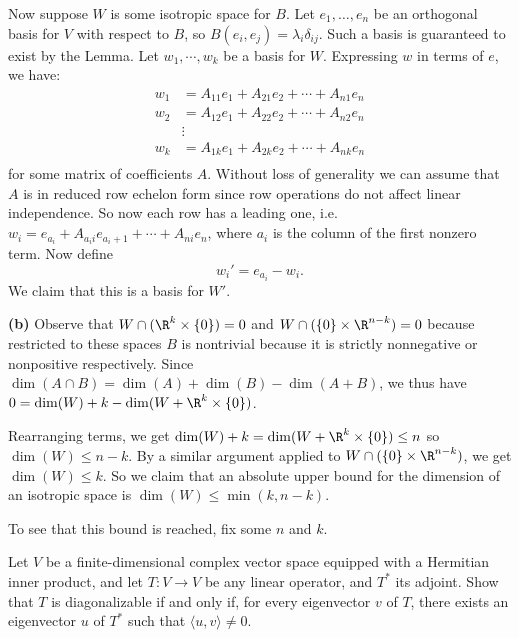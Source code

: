 \documentclass[11pt, letterpaper]{article}
\begin{document}
Now suppose $W$ is some isotropic space for $B$. Let $e_1,\ldots, e_n$ be an orthogonal basis for $V$ with respect to $B$, so $B(e_i, e_j)=\lambda_i\delta_{ij}$. Such a basis is guaranteed to exist by the Lemma. Let $w_1,\cdots,w_k$ be a basis for $W$. Expressing $w$ in terms of $e$, we have: 
\[
    \begin{aligned}
        w_1&=A_{11}e_1+A_{21}e_2+\cdots+A_{n1}e_n\\
        w_2&=A_{12}e_1+A_{22}e_2+\cdots+A_{n2}e_n\\
        &\vdots\\
        w_k&=A_{1k}e_1+A_{2k}e_2+\cdots+A_{nk}e_n\\
    \end{aligned}
\]
for some matrix of coefficients $A$. Without loss of generality we can assume that $A$ is in reduced row echelon form since row operations do not affect linear independence. So now each row has a leading one, i.e. $w_i=e_{a_i}+A_{a_ii}e_{a_i+1}+\cdots+A_{ni}e_n$, where $a_i$ is the column of the first nonzero term. Now define
\[
    w_i' = e_{a_i} - w_i
.\] 
We claim that this is a basis for $W'$. 

\textbf{(b)} Observe that $W\cap (\R^k\times\{0\})=0$ and $W\cap (\{0\}\times \R^{n-k})=0$ because restricted to these spaces $B$ is nontrivial because it is strictly nonnegative or nonpositive respectively. Since $\dim(A\cap B)=\dim(A)+\dim(B)-\dim(A+B)$, we thus have $0=\dim(W)+k-\dim(W+\R^k\times\{0\})$. 

Rearranging terms, we get $\dim(W)+k=\dim(W+\R^k\times\{0\})\leq n$ so $\dim(W)\leq n-k$. By a similar argument applied to $W\cap (\{0\}\times \R^{n-k})$, we get $\dim(W)\leq k$. So we claim that an absolute upper bound for the dimension of an isotropic space is $\dim(W)\leq \min(k,n-k)$.

To see that this bound is reached, fix some $n$ and $k$.

\pagebreak
\begin{problem}
    Let $V$ be a finite-dimensional complex vector space equipped with a Hermitian inner product, and let $T:V\to V$ be any linear operator, and $T^*$ its adjoint. Show that $T$ is diagonalizable if and only if, for every eigenvector $v$ of $T$, there exists an eigenvector $u$ of $T^*$ such that $\langle u,v\rangle\neq 0$.
\end{problem}
\end{document}
